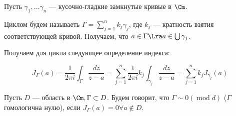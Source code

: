 Пусть \(\gamma_1, \dots \gamma_n\) --- кусочно-гладкие замкнутые кривые в \(\Cm\). 

\begin{definition}
    Циклом будем называеть \(\Gamma = \sum_{j = 1}^n k_j\gamma_j\), где \(k_j\) --- кратность взятия соответствующей кривой. Получаем, что \(a \in \Gamma \Lra a \in \bigcup \gamma_j\).
\end{definition}

Получаем для цикла следующее определение индекса:
\begin{definition}
    \[J_\Gamma(a) = \frac{1}{2\pi i}\int_\Gamma \frac{dz}{z - a} = \sum_{j = 1}^n \frac{1}{2\pi i}k_j \int_{\gamma_j}\frac{dz}{z - a} = \sum_{j = 1}^n k_j J_{\gamma_j}(a)\]
\end{definition}

\begin{definition}
    Пусть \(D\) --- область в \(\Cm, \Gamma \subset D\). Будем говорит, что \(\Gamma \sim 0 (\operatorname{mod} d)\) (\(\Gamma\) гомологична нулю), если \(J_\Gamma(a) = 0 \forall a \notin D\).
\end{definition}

